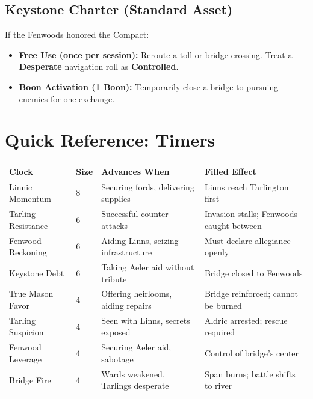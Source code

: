 \documentclass[11pt,a5paper]{book}
\begin{document}
\section*{Keystone Charter (Standard Asset)}

If the Fenwoods honored the Compact:
\begin{itemize}[leftmargin=*]
\item \textbf{Free Use (once per session):} Reroute a toll or bridge crossing. Treat a \textbf{Desperate} navigation roll as \textbf{Controlled}.
\item \textbf{Boon Activation (1 Boon):} Temporarily close a bridge to pursuing enemies for one exchange.
\end{itemize}

\clearpage

\chapter*{Quick Reference: Timers}

\begin{center}
\begin{tabular}{@{}llp{5cm}p{5cm}@{}}
\toprule
\textbf{Clock} & \textbf{Size} & \textbf{Advances When} & \textbf{Filled Effect} \\
\midrule
Linnic Momentum & 8 & Securing fords, delivering supplies & Linns reach Tarlington first \\
Tarling Resistance & 6 & Successful counter-attacks & Invasion stalls; Fenwoods caught between \\
Fenwood Reckoning & 6 & Aiding Linns, seizing infrastructure & Must declare allegiance openly \\
Keystone Debt & 6 & Taking Aeler aid without tribute & Bridge closed to Fenwoods \\
True Mason Favor & 4 & Offering heirlooms, aiding repairs & Bridge reinforced; cannot be burned \\
Tarling Suspicion & 4 & Seen with Linns, secrets exposed & Aldric arrested; rescue required \\
Fenwood Leverage & 4 & Securing Aeler aid, sabotage & Control of bridge's center \\
Bridge Fire & 4 & Wards weakened, Tarlings desperate & Span burns; battle shifts to river \\
\bottomrule
\end{tabular}
\end{center}
\end{document}

